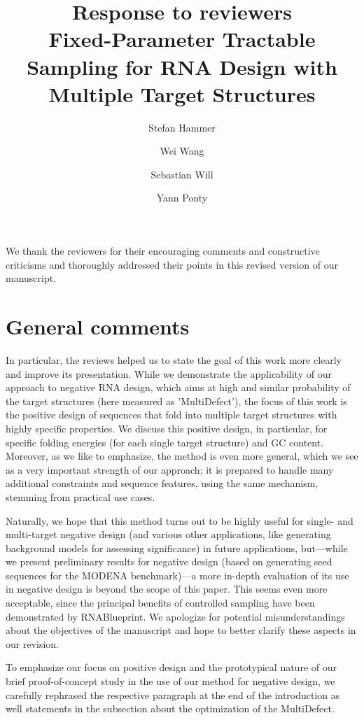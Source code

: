 \documentclass[11pt,hyperref]{article} %
\title{Response to reviewers\\[.3em]Fixed-Parameter Tractable Sampling for RNA Design with Multiple Target Structures}
\author{
Stefan Hammer \and Wei Wang \and Sebastian Will \and Yann Ponty}
\date{} %
\begin{document}
\maketitle

We thank the reviewers for their encouraging comments and constructive criticisms and thoroughly addressed their points in this revised version of our manuscript.

\section{General comments}

In particular, the reviews helped us to state the goal of this work more clearly and improve its presentation. While we demonstrate the applicability of our approach to negative RNA design, which  aims at high and similar probability of the target structures (here measured as 'MultiDefect'), the focus of this work is the positive design of sequences that fold into multiple target structures with highly specific properties. We discuss this positive design, in particular, for specific folding energies (for each single target structure) and GC content. Moreover, as we like to emphasize, the method is even more general, which we see as a very important strength of our approach; it is prepared to handle many additional constraints and sequence features, using the same mechanism, stemming from practical use cases. 

Naturally, we hope that this method turns out to be highly useful for single- and multi-target negative design (and various other applications, like generating background models for assessing significance) in future applications, but---while we present preliminary results for negative design (based on generating seed sequences for the MODENA benchmark)---a more in-depth evaluation of its use in negative design is beyond the scope of this paper. This seems even more acceptable, since the principal benefits of controlled sampling  have been demonstrated by RNABlueprint. We apologize for potential misunderstandings about the objectives of the manuscript and hope to better clarify these aspects in our revision.

To emphasize our focus on positive design and the prototypical nature of our brief proof-of-concept study in the use of our method for negative design, we carefully rephrased the respective paragraph at the end of the introduction as well statements in the subsection about the optimization of the MultiDefect. 
\end{document}
